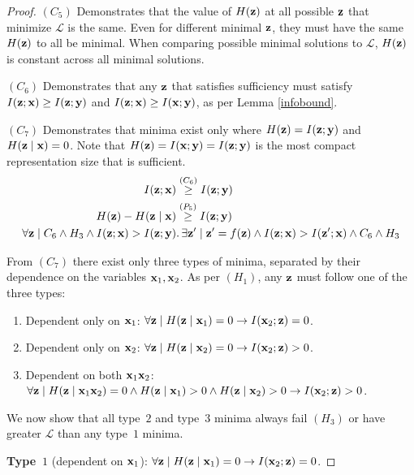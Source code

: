 \begin{proof}
$(C_5)$ Demonstrates that the value of $H({\mathbf{z}})$ at all possible ${\mathbf{z}}$ that minimize $\mathcal{L}$ is the same. Even for different minimal ${\mathbf{z}}$, they must have the same $H({\mathbf{z}})$ to all be minimal. When comparing possible minimal solutions to $\mathcal{L}$, $H({\mathbf{z}})$ is constant across all minimal solutions.

$(C_6)$ Demonstrates that any ${\mathbf{z}}$ that satisfies sufficiency must satisfy $I({\mathbf{z}}; {\mathbf{x}}) \geq I({\mathbf{z}}; {\mathbf{y}})$ and $I({\mathbf{z}}; {\mathbf{x}}) \geq I({\mathbf{x}}; {\mathbf{y}})$, as per Lemma \ref{infobound}.

$(C_7)$ Demonstrates that minima exist only where $H({\mathbf{z}}) = I({\mathbf{z}}; {\mathbf{y}})$ and $H({\mathbf{z}} \mid {\mathbf{x}}) = 0$. Note that $H({\mathbf{z}}) = I({\mathbf{x}}; {\mathbf{y}}) = I({\mathbf{z}}; {\mathbf{y}})$ is the most compact representation size that is sufficient.
\begin{align*} I({\mathbf{z}};{\mathbf{x}}) &\stackrel{\left(C_6\right)}{\geq} I({\mathbf{z}}; {\mathbf{y}}) \\ H({\mathbf{z}}) - H({\mathbf{z}} \mid {\mathbf{x}}) &\stackrel{\left(P_5\right)}{\geq} I({\mathbf{z}}; {\mathbf{y}}) \\ \forall {\mathbf{z}} \mid C_6 \land H_3 \land I({\mathbf{z}}; {\mathbf{x}}) > I({\mathbf{z}}; {\mathbf{y}}) &.\, \exists {\mathbf{z}}' \mid {\mathbf{z}}' = f({\mathbf{z}}) \land I({\mathbf{z}}; {\mathbf{x}}) > I({\mathbf{z}}'; {\mathbf{x}}) \land C_6 \land H_3 \end{align*}

From $(C_7)$ there exist only three types of minima, separated by their dependence on the variables ${\mathbf{x}}_1, {\mathbf{x}}_2$. As per $(H_1)$, any ${\mathbf{z}}$ must follow one of the three types:
\begin{enumerate}
\item Dependent only on ${\mathbf{x}}_1$: $\forall {\mathbf{z}} \mid H({\mathbf{z}} \mid {\mathbf{x}}_1)=0 \rightarrow I({\mathbf{x}}_2; {\mathbf{z}}) = 0$.
\item Dependent only on ${\mathbf{x}}_2$: $\forall {\mathbf{z}} \mid H({\mathbf{z}} \mid {\mathbf{x}}_2)=0 \rightarrow I({\mathbf{x}}_2; {\mathbf{z}}) > 0$.
\item Dependent on both ${\mathbf{x}}_1 {\mathbf{x}}_2$: $\forall {\mathbf{z}} \mid H({\mathbf{z}} \mid {\mathbf{x}}_1 {\mathbf{x}}_2)=0 \land H({\mathbf{z}} \mid {\mathbf{x}}_1)>0 \land H({\mathbf{z}} \mid {\mathbf{x}}_2)>0 \rightarrow I({\mathbf{x}}_2; {\mathbf{z}}) > 0$.
\end{enumerate}
We now show that all type~$2$ and type~$3$ minima always fail $(H_3)$ or have greater $\mathcal{L}$ than any type~$1$ minima.

\textbf{Type~$1$} (dependent on ${\mathbf{x}}_1$): $\forall {\mathbf{z}} \mid H({\mathbf{z}} \mid {\mathbf{x}}_1)=0 \rightarrow I({\mathbf{x}}_2; {\mathbf{z}}) = 0$.


\end{proof}
